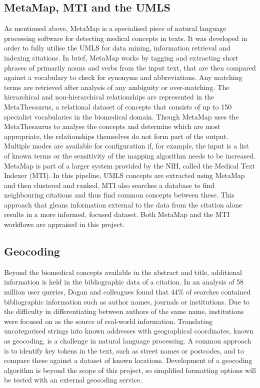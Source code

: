 \documentclass[Report.tex]{subfiles}
\begin{document}
\subsection{MetaMap, MTI and the UMLS}
As mentioned above, MetaMap is a specialised piece of natural language processing software for detecting medical concepts in texts. It was developed in order to fully utilise the UMLS for data mining, information retrieval and indexing citations\cite{metamap2000}. In brief, MetaMap works by tagging and extracting short phrases of primarily nouns and verbs from the input text, that are then compared against a vocabulary to check for synonyms and abbreviations. Any matching terms are retrieved after analysis of any ambiguity or over-matching. The hierarchical and non-hierarchical relationships are represented in the MetaThesaurus, a relational dataset of concepts that consists of up to 150 specialist vocabularies in the biomedical domain. Though MetaMap uses the MetaThesaurus to analyse the concepts and determine which are most appropriate, the relationships themselves do not form part of the output. Multiple modes are available for configuration if, for example, the input is a list of known terms or the sensitivity of the mapping algorithm needs to be increased\cite{metamap2010}. MetaMap is part of a larger system provided by the NIH, called the Medical Text Indexer (MTI)\cite{mti}. In this pipeline, UMLS concepts are extracted using MetaMap and then clustered and ranked. MTI also searches a database to find neighbouring citations and thus find common concepts between these. This approach that gleans information external to the data from the citation alone results in a more informed, focused dataset. Both MetaMap and the MTI workflows are appraised in this project.
 
\subsection{Geocoding}
Beyond the biomedical concepts available in the abstract and title, additional information is held in the bibliographic data of a citation. In an analysis of 58 million user queries, Dogan and colleagues found that 44\% of searches contained bibliographic information such as author names, journals or institutions\cite{dogan}. Due to the difficulty in differentiating between authors of the same name, institutions were focused on as the source of real-world information. Translating uncategorised strings into known addresses with geographical coordinates, known as geocoding, is a challenge in natural language processing. A common approach is to identify key tokens in the text, such as street names or postcodes, and to compare these against a dataset of known locations\cite{goldberg2007text}. Development of a geocoding algorithm is beyond the scope of this project, so simplified formatting options will be tested with an external geocoding service.   
\end{document}
